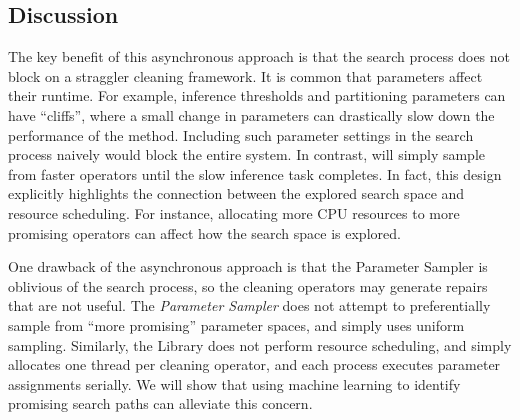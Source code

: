 \subsection{Discussion} 
The key benefit of this asynchronous approach is that the search process does not block on a straggler cleaning framework.  It is common that parameters affect their runtime.  For example, inference thresholds and partitioning parameters can have ``cliffs'', where a small change in parameters can drastically slow down the performance of the method. Including such parameter settings in the search process naively would block the entire system.  In contrast, \sys will simply sample from faster operators until the slow inference task completes.    In fact, this design explicitly highlights the connection between the explored search space and resource scheduling.  For instance,  allocating more CPU resources to more promising operators can affect how the search space is explored.

One drawback of the asynchronous approach is that the Parameter Sampler is oblivious of the search process, so the cleaning operators may generate repairs that are not useful.   The {\it Parameter Sampler} does not attempt to preferentially sample from ``more promising'' parameter spaces, and simply uses uniform sampling.  Similarly, the Library does not perform resource scheduling, and simply allocates one thread per cleaning operator, and each process executes parameter assignments serially. 
We will show that using machine learning to identify promising search paths can alleviate this concern.




